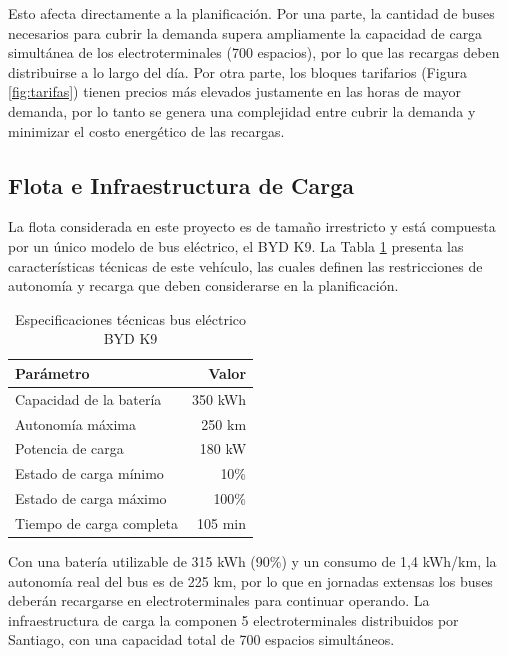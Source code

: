 Esto afecta directamente a la planificaci\'on. Por una parte, la cantidad de buses necesarios para cubrir la demanda supera ampliamente la capacidad de carga simult\'anea de los electroterminales (700 espacios), por lo que las recargas deben distribuirse a lo largo del d\'ia. Por otra parte, los bloques tarifarios (Figura \ref{fig:tarifas}) tienen precios m\'as elevados justamente en las horas de mayor demanda, por lo tanto se genera una complejidad entre cubrir la demanda y minimizar el costo energ\'etico de las recargas.

\subsection{Flota e Infraestructura de Carga \label{sec:flotainfraestructura}}

La flota considerada en este proyecto es de tama\~no irrestricto y est\'a compuesta por un \'unico modelo de bus el\'ectrico, el BYD K9. La Tabla \ref{tab:especificaciones} presenta las caracter\'isticas t\'ecnicas de este veh\'iculo, las cuales definen las restricciones de autonom\'ia y recarga que deben considerarse en la planificaci\'on.

\begin{table}[htb]
\begin{center}
\small
\caption[Especificaciones t\'ecnicas bus el\'ectrico BYD K9]{Especificaciones t\'ecnicas bus el\'ectrico BYD K9}
\label{tab:especificaciones}
\begin{tabular}{@{}l r@{}}\toprule
\textbf{Par\'ametro} & \textbf{Valor} \\ \midrule
Capacidad de la bater\'ia & 350 kWh \\
Autonom\'ia m\'axima & 250 km \\
Potencia de carga & 180 kW \\
Estado de carga m\'inimo & 10\% \\
Estado de carga m\'aximo & 100\% \\
Tiempo de carga completa & 105 min \\
\bottomrule
\end{tabular}
\end{center}
\end{table}

Con una bater\'ia utilizable de 315 kWh (90\%) y un consumo de 1,4 kWh/km, la autonom\'ia real del bus es de 225 km, por lo que en jornadas extensas los buses deber\'an recargarse en electroterminales para continuar operando. La infraestructura de carga la componen 5 electroterminales distribuidos por Santiago, con una capacidad total de 700 espacios simult\'aneos.

